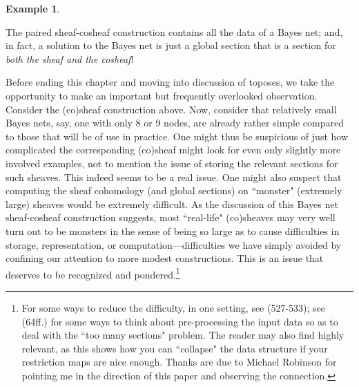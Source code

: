 \documentclass[a4paper]{book}
\theoremstyle{definition}
\newtheorem{example}{Example}[section]
\theoremstyle{definition}
\theoremstyle{definition}
\theoremstyle{theorem}
\theoremstyle{definition}
\begin{document}
\begin{example}
\begin{center}
	\end{center} 
 The paired sheaf-cosheaf construction contains all the data of a Bayes net; and, in fact, a solution to the Bayes net is just a global section that is a section for \textit{both the sheaf and the cosheaf}! \par  
 Before ending this chapter and moving into discussion of toposes, we take the opportunity to make an important but frequently overlooked observation. Consider the (co)sheaf construction above. Now, consider that relatively small Bayes nets, say, one with only 8 or 9 nodes, are already rather simple compared to those that will be of use in practice. One might thus be suspicious of just how complicated the corresponding (co)sheaf might look for even only slightly more involved examples, not to mention the issue of storing the relevant sections for such sheaves. This indeed seems to be a real issue. One might also suspect that computing the sheaf cohomology (and global sections) on ``monster" (extremely large) sheaves would be extremely difficult. As the discussion of this Bayes net sheaf-cosheaf construction suggests, most ``real-life" (co)sheaves may very well turn out to be monsters in the sense of being so large as to cause difficulties in storage, representation, or computation---difficulties we have simply avoided by confining our attention to more modest constructions. This is an issue that deserves to be recognized and pondered.\footnote{For some ways to reduce the difficulty, in one setting, see \cite{smith_introduction_2014} (527-533); see \cite{curry_sheaves_2013} (64ff.) for some ways to think about pre-processing the input data so as to deal with the ``too many sections" problem. The reader may also find \cite{curry_discrete_2015} highly relevant, as this shows how you can ``collapse" the data structure if your restriction maps are nice enough. Thanks are due to Michael Robinson for pointing me in the direction of this paper and observing the connection.}       
\end{example}
\printbibliography 
\printindex
\end{document}
